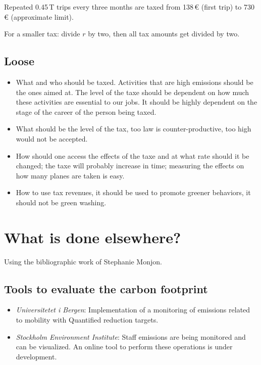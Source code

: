 \documentclass[version=3.21, pagesize, twoside=off, bibliography=totoc, DIV=calc, fontsize=12pt, a4paper, french, english]{scrartcl}
\begin{document}
Repeated 0.45\,T trips every three months are taxed from 138\,€ (first trip) to 730\,€ (approximate limit).

For a smaller tax: divide $r$ by two, then all tax amounts get divided by two.

\subsection{Loose}
\begin{itemize}
\item What and who should be taxed. Activities that are high emissions should be the ones aimed at. The level of the taxe should be dependent on how much these activities are essential to our jobs. It should be highly dependent on the stage of the career of the person being taxed.
\item What should be the level of the tax, too law is counter-productive, too high would not be accepted.  
\item How should one access the effects of the taxe and at what rate should it be changed; the taxe will probably increase in time; measuring the effects on how many planes are taken is easy.  
\item How to use tax revenues, it should be used to promote greener behaviors, it should not be green washing. 
\end{itemize}

%

\appendix
\section{What is done elsewhere?} 
Using the bibliographic work of Stephanie Monjon. 

\subsection{Tools to evaluate the carbon footprint}
\begin{itemize}
\item \emph{Universitetet i Bergen}: Implementation of a monitoring of emissions related to mobility with Quantified reduction targets. 
\item \emph{Stockholm Environment Institute}: Staff emissions are being monitored and can be visualized. An online tool to perform these operations is under development.
\end{itemize}
\end{document}
